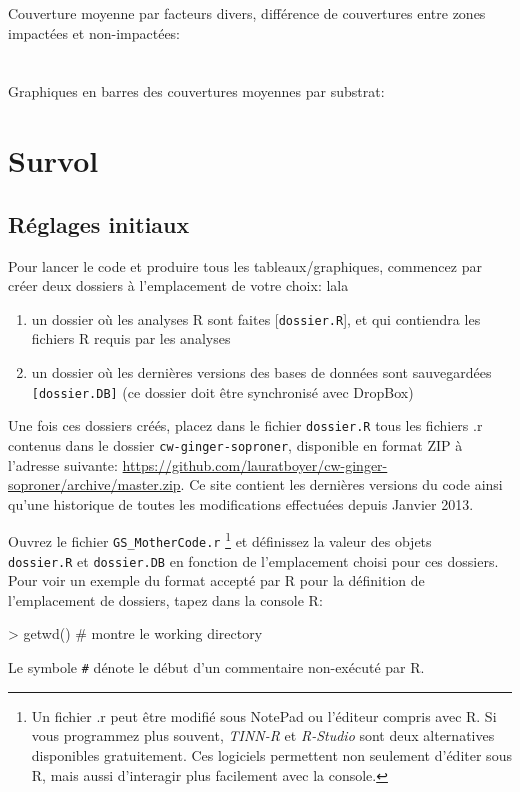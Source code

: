 \documentclass{article}
\begin{document}
\noindent Couverture moyenne par facteurs divers, différence de
couvertures entre zones impactées et non-impactées:\\
\hyperlink{l3} {}\\
\hyperlink{l4} {}\\

\noindent Graphiques en barres des couvertures moyennes par substrat:\\
\hyperlink{l5} {}

\clearpage
\section{Survol}

\subsection{Réglages initiaux}

Pour lancer le code et produire tous les tableaux/graphiques,
commencez par créer deux dossiers à l'emplacement de votre choix:
\hypertarget{reglages1}{lala}
\begin{enumerate}
      \item un dossier où les analyses R sont faites
      [\texttt{dossier.R}], et qui contiendra les fichiers R requis par
      les analyses
  \item un dossier où les dernières versions des bases de données sont
    sauvegardées \texttt{[dossier.DB]} (ce dossier doit être
    synchronisé avec DropBox)
     \end{enumerate}

     Une fois ces dossiers créés, placez dans le fichier
     \texttt{dossier.R} tous les fichiers .r contenus dans le dossier
     \texttt{cw-ginger-soproner}, disponible en format ZIP à l'adresse
     suivante:
     \url{https://github.com/lauratboyer/cw-ginger-soproner/archive/master.zip}. Ce
     site contient les dernières versions du code ainsi qu'une
     historique de toutes les modifications effectuées depuis Janvier 2013.

Ouvrez le fichier \texttt{GS\_MotherCode.r} \footnote{Un fichier .r
  peut être modifié sous NotePad ou l'éditeur
compris avec R. Si vous programmez plus souvent, \emph{TINN-R} et \emph{R-Studio}
sont deux alternatives disponibles gratuitement. Ces logiciels
permettent non seulement
d'éditer sous R, mais aussi d'interagir plus facilement avec la
console. } et définissez la valeur des objets \\ \texttt{dossier.R} et \texttt{dossier.DB}
en fonction de l'emplacement choisi pour ces dossiers.
Pour voir un exemple du format accepté par R pour la
  définition de l'emplacement de dossiers, tapez dans la console R:
\begin{Schunk}
\begin{Sinput}
> getwd() # montre le working directory
\end{Sinput}
\end{Schunk}
  \noindent Le symbole \texttt{\#} dénote le début d'un commentaire non-exécuté
par R.\\
\end{document}
